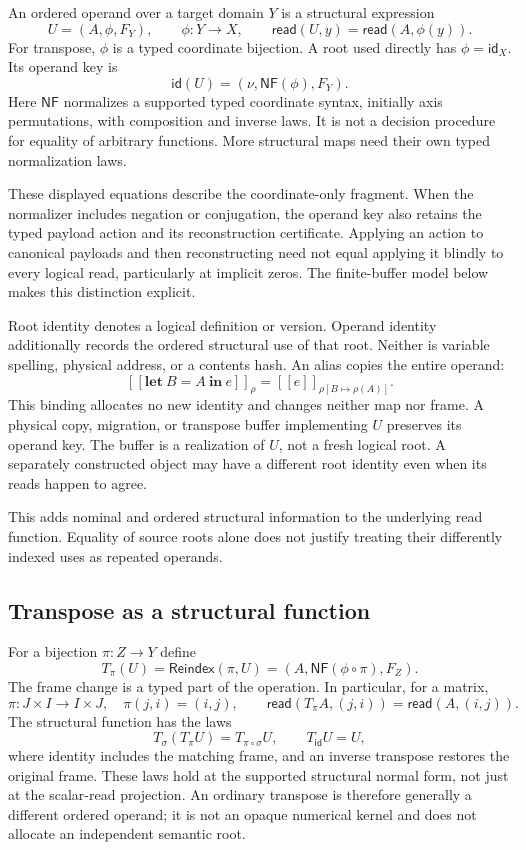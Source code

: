 \documentclass[11pt]{article}
\newcommand{\eval}[1]{[\![#1]\!]}
\newcommand{\rd}{\mathsf{read}}
\newcommand{\cid}{\mathsf{id}}
\begin{document}
An ordered operand over a target domain $Y$ is a structural expression
\[
 U=(A,\phi,F_Y),\qquad \phi:Y\longrightarrow X,\qquad
 \rd(U,y)=\rd(A,\phi(y)).
\]
For transpose, $\phi$ is a typed coordinate bijection. A root used directly has $\phi=\mathsf{id}_X$. Its operand key is
\[
 \cid(U)=(\nu,\mathsf{NF}(\phi),F_Y).
\]
Here $\mathsf{NF}$ normalizes a supported typed coordinate syntax, initially axis permutations, with composition and inverse laws. It is not a decision procedure for equality of arbitrary functions. More structural maps need their own typed normalization laws.

These displayed equations describe the coordinate-only fragment. When the
normalizer includes negation or conjugation, the operand key also retains the
typed payload action and its reconstruction certificate. Applying an action to
canonical payloads and then reconstructing need not equal applying it blindly
to every logical read, particularly at implicit zeros. The finite-buffer model
below makes this distinction explicit.

Root identity denotes a logical definition or version. Operand identity additionally records the ordered structural use of that root. Neither is variable spelling, physical address, or a contents hash. An alias copies the entire operand:
\[
 \eval{\mathbf{let}\ B=A\ \mathbf{in}\ e}_{\rho}
   =\eval e_{\rho[B\mapsto\rho(A)]}.
\]
This binding allocates no new identity and changes neither map nor frame. A physical copy, migration, or transpose buffer implementing $U$ preserves its operand key. The buffer is a realization of $U$, not a fresh logical root. A separately constructed object may have a different root identity even when its reads happen to agree.

This adds nominal and ordered structural information to the underlying read function. Equality of source roots alone does not justify treating their differently indexed uses as repeated operands.

\subsection{Transpose as a structural function}
For a bijection $\pi:Z\to Y$ define
\[
 T_\pi(U)=\mathsf{Reindex}(\pi,U)
       =(A,\mathsf{NF}(\phi\circ\pi),F_Z).
\]
The frame change is a typed part of the operation. In particular, for a matrix,
\[
 \pi:J\times I\to I\times J,\quad \pi(j,i)=(i,j),
 \qquad \rd(T_\pi A,(j,i))=\rd(A,(i,j)).
\]
The structural function has the laws
\[
 T_\sigma(T_\pi U)=T_{\pi\circ\sigma}U,\qquad
 T_{\mathsf{id}}U=U,
\]
where identity includes the matching frame, and an inverse transpose restores the original frame. These laws hold at the supported structural normal form, not just at the scalar-read projection. An ordinary transpose is therefore generally a different ordered operand; it is not an opaque numerical kernel and does not allocate an independent semantic root.
\end{document}
